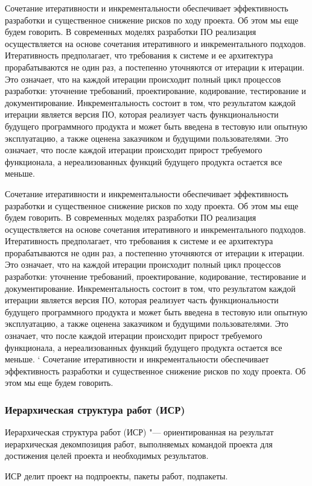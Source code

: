 \documentclass{../industrial-development}
\begin{document}
Сочетание итеративности и инкрементальности обеспечивает эффективность разработки и существенное снижение рисков по ходу проекта. Об этом мы еще будем говорить.
В современных моделях разработки ПО реализация осуществляется на основе сочетания итеративного и инкрементального подходов.
Итеративность предполагает, что требования к системе и ее архитектура прорабатываются не один раз, а постепенно уточняются от итерации к итерации. Это означает, что на каждой итерации происходит полный цикл процессов разработки: уточнение требований, проектирование, кодирование, тестирование и документирование.
Инкрементальность состоит в том, что результатом каждой итерации является версия ПО, которая реализует часть функциональности будущего программного продукта и может быть введена в тестовую или опытную эксплуатацию, а также оценена заказчиком и будущими пользователями. Это означает, что после каждой итерации происходит прирост требуемого функционала, а нереализованных функций будущего продукта остается все меньше.

Сочетание итеративности и инкрементальности обеспечивает эффективность разработки и существенное снижение рисков по ходу проекта. Об этом мы еще будем говорить.
В современных моделях разработки ПО реализация осуществляется на основе сочетания итеративного и инкрементального подходов.
Итеративность предполагает, что требования к системе и ее архитектура прорабатываются не один раз, а постепенно уточняются от итерации к итерации. Это означает, что на каждой итерации происходит полный цикл процессов разработки: уточнение требований, проектирование, кодирование, тестирование и документирование.
Инкрементальность состоит в том, что результатом каждой итерации является версия ПО, которая реализует часть функциональности будущего программного продукта и может быть введена в тестовую или опытную эксплуатацию, а также оценена заказчиком и будущими пользователями. Это означает, что после каждой итерации происходит прирост требуемого функционала, а нереализованных функций будущего продукта остается все меньше.
`
Сочетание итеративности и инкрементальности обеспечивает эффективность разработки и существенное снижение рисков по ходу проекта. Об этом мы еще будем говорить.

    \begin{frame} \frametitle{Иерархическая структура работ (ИСР)}
	\begin{definition}
	Иерархическая структура работ (ИСР) "--- ориентированная на результат иерархическая декомпозиция работ, выполняемых командой проекта для достижения целей проекта и необходимых результатов.
	\end{definition}

	ИСР делит проект на подпроекты, пакеты работ, подпакеты.
    \end{frame}
    \lecturenotes
\end{document}
